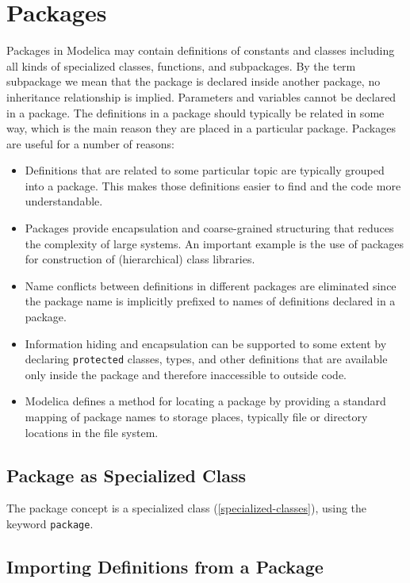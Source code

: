 \chapter{Packages}\label{packages}

Packages in Modelica may contain definitions of constants and classes including all kinds of specialized classes, functions, and subpackages.
By the term subpackage we mean that the package is declared inside another package, no inheritance relationship is implied.
Parameters and variables cannot be declared in a package.
The definitions in a package should typically be related in some way, which is the main reason they are placed in a particular package.
Packages are useful for a number of reasons:
\begin{itemize}
\item
  Definitions that are related to some particular topic are typically grouped into a package.
  This makes those definitions easier to find and the code more understandable.
\item
  Packages provide encapsulation and coarse-grained structuring that reduces the complexity of large systems.
  An important example is the use of packages for construction of (hierarchical) class libraries.
\item
  Name conflicts between definitions in different packages are eliminated since the package name is implicitly prefixed to names of definitions declared in a package.
\item
  Information hiding and encapsulation can be supported to some extent by declaring \lstinline!protected! classes, types, and other definitions that are available only inside the package and therefore inaccessible to outside code.
\item
  Modelica defines a method for locating a package by providing a standard mapping of package names to storage places, typically file or directory locations in the file system.
\end{itemize}


\section{Package as Specialized Class}\label{package-as-specialized-class}

The package concept is a specialized class (\cref{specialized-classes}), using the keyword \lstinline!package!.


\section{Importing Definitions from a Package}\label{importing-definitions-from-a-package}

